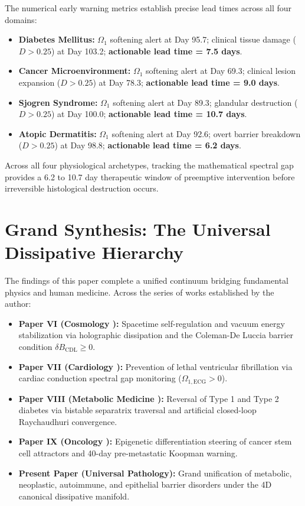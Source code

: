 \documentclass[11pt,a4paper]{article}
\begin{document}
The numerical early warning metrics establish precise lead times across all four domains:
\begin{itemize}
    \item \textbf{Diabetes Mellitus:} $\Omega_1$ softening alert at Day 95.7; clinical tissue damage ($D > 0.25$) at Day 103.2; \textbf{actionable lead time = 7.5 days}.
    \item \textbf{Cancer Microenvironment:} $\Omega_1$ softening alert at Day 69.3; clinical lesion expansion ($D > 0.25$) at Day 78.3; \textbf{actionable lead time = 9.0 days}.
    \item \textbf{Sjogren Syndrome:} $\Omega_1$ softening alert at Day 89.3; glandular destruction ($D > 0.25$) at Day 100.0; \textbf{actionable lead time = 10.7 days}.
    \item \textbf{Atopic Dermatitis:} $\Omega_1$ softening alert at Day 92.6; overt barrier breakdown ($D > 0.25$) at Day 98.8; \textbf{actionable lead time = 6.2 days}.
\end{itemize}

Across all four physiological archetypes, tracking the mathematical spectral gap provides a 6.2 to 10.7 day therapeutic window of preemptive intervention before irreversible histological destruction occurs.

\section{Grand Synthesis: The Universal Dissipative Hierarchy}

The findings of this paper complete a unified continuum bridging fundamental physics and human medicine. Across the series of works established by the author:
\begin{itemize}
    \item \textbf{Paper VI (Cosmology \cite{Yoshikai2026f}):} Spacetime self-regulation and vacuum energy stabilization via holographic dissipation and the Coleman-De Luccia barrier condition $\delta B_{\mathrm{CDL}} \ge 0$.
    \item \textbf{Paper VII (Cardiology \cite{Yoshikai2026g}):} Prevention of lethal ventricular fibrillation via cardiac conduction spectral gap monitoring ($\Omega_{1,\mathrm{ECG}} > 0$).
    \item \textbf{Paper VIII (Metabolic Medicine \cite{Yoshikai2026h}):} Reversal of Type 1 and Type 2 diabetes via bistable separatrix traversal and artificial closed-loop Raychaudhuri convergence.
    \item \textbf{Paper IX (Oncology \cite{Yoshikai2026i}):} Epigenetic differentiation steering of cancer stem cell attractors and 40-day pre-metastatic Koopman warning.
    \item \textbf{Present Paper (Universal Pathology):} Grand unification of metabolic, neoplastic, autoimmune, and epithelial barrier disorders under the 4D canonical dissipative manifold.
\end{itemize}
\end{document}
